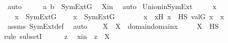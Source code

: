 \begin{isabellebody}
\ auto\isanewline
\ \ \isamarkupfalse%
\ \isamarkupfalse%
\ {\isachardoublequoteopen}{\isacharbraceleft}{\kern0pt}a{\isacharcomma}{\kern0pt}\ b{\isacharbraceright}{\kern0pt}\ {\isasymin}\ SymExt{\isacharparenleft}{\kern0pt}G{\isacharparenright}{\kern0pt}{\isachardoublequoteclose}\ \isamarkupfalse%
\ Xin\ \isamarkupfalse%
\ auto\isanewline
{}\isamarkupfalse%
%
\endisatagproof
{\isafoldproof}%
%
\isadelimproof
\isanewline
%
\endisadelimproof
\isanewline
{}\isamarkupfalse%
\ Union{\isacharunderscore}{\kern0pt}in{\isacharunderscore}{\kern0pt}SymExt\ {\isacharcolon}{\kern0pt}\ \isanewline
\ \ \ x\ \isanewline
\ \ \ {\isachardoublequoteopen}x\ {\isasymin}\ SymExt{\isacharparenleft}{\kern0pt}G{\isacharparenright}{\kern0pt}{\isachardoublequoteclose}\ \isanewline
\ \ \ {\isachardoublequoteopen}{\isasymUnion}x\ {\isasymin}\ SymExt{\isacharparenleft}{\kern0pt}G{\isacharparenright}{\kern0pt}{\isachardoublequoteclose}\ \isanewline
%
\isadelimproof
%
\endisadelimproof
%
\isatagproof
{}\isamarkupfalse%
\ {\isacharminus}{\kern0pt}\ \isanewline
\ \ \isamarkupfalse%
\ x{\isacharprime}{\kern0pt}\ \ x{\isacharprime}{\kern0pt}H{\isacharcolon}{\kern0pt}\ {\isachardoublequoteopen}x{\isacharprime}{\kern0pt}\ {\isasymin}\ HS{\isachardoublequoteclose}\ {\isachardoublequoteopen}val{\isacharparenleft}{\kern0pt}G{\isacharcomma}{\kern0pt}\ x{\isacharprime}{\kern0pt}{\isacharparenright}{\kern0pt}\ {\isacharequal}{\kern0pt}\ x{\isachardoublequoteclose}\ \isamarkupfalse%
\ assms\ SymExt{\isacharunderscore}{\kern0pt}def\ \isamarkupfalse%
\ auto\isanewline
\ \ \isamarkupfalse%
\ X\ \ {\isachardoublequoteopen}X\ {\isasymequiv}\ domain{\isacharparenleft}{\kern0pt}{\isasymUnion}{\isacharparenleft}{\kern0pt}domain{\isacharparenleft}{\kern0pt}x{\isacharprime}{\kern0pt}{\isacharparenright}{\kern0pt}{\isacharparenright}{\kern0pt}{\isacharparenright}{\kern0pt}{\isachardoublequoteclose}\ \isanewline
\isanewline
\ \ \isamarkupfalse%
\ {\isachardoublequoteopen}X\ {\isasymsubseteq}\ HS{\isachardoublequoteclose}\ \isanewline
\ \ \isamarkupfalse%
{\isacharparenleft}{\kern0pt}rule\ subsetI{\isacharparenright}{\kern0pt}\isanewline
\ \ \ \ \isamarkupfalse%
\ z\ \isamarkupfalse%
\ xin\ {\isacharcolon}{\kern0pt}\ {\isachardoublequoteopen}z\ {\isasymin}\ X{\isachardoublequoteclose}\ \isanewline

\end{isabellebody}
